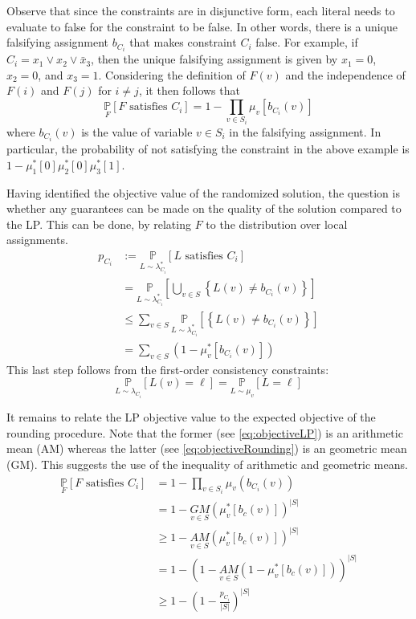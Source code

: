 Observe that since the constraints are in disjunctive form, each literal needs to evaluate to false for the constraint to be false. 
In other words, there is a unique falsifying assignment $b_{C_i}$ that makes constraint $C_i$ false. 
For example, if $C_i = x_1 \vee x_2 \vee \bar{x}_3$, then the unique falsifying assignment is given by $x_1 = 0$, $x_2 = 0$, and $x_3 = 1$. 
Considering the definition of $F(v)$ and the independence of $F(i)$ and $F(j)$ for $i \neq j$, it then follows that 
\begin{equation}
		\underset{F}{\mathbb{P}}[ F \text{ satisfies } C_i] = 1 - \prod_{v \in S_i} \mu_v[b_{C_i}(v)] \label{eq:objectiveRounding}
\end{equation}
where $b_{C_i}(v)$ is the value of variable $v \in S_i$ in the falsifying assignment. 
In particular, the probability of not satisfying the constraint in the above example is $ 1- \mu_1^*[0] \mu_2^*[0] \mu_3^*[1]$.

Having identified the objective value of the randomized solution, the question is whether any guarantees can be made on the quality of the solution compared to the LP. 
This can be done, by relating $F$ to the distribution over local assignments.
\begin{align}
	p_{C_i} &:= \underset{L \sim \lambda_{C_i}^*}{\mathbb{P}} [L \text{ satisfies } C_i] \nonumber\\
			&=  \underset{L \sim \lambda_{C_i}^*}{\mathbb{P}}\left[ \bigcup_{v \in S} \left\{ L(v) \neq b_{C_i}(v) \right\} \right] \nonumber\\
			&\le \sum_{v \in  S } \underset{L \sim \lambda_{C_i}^*}{\mathbb{P}} \left[  \left\{ L(v) \neq b_{C_i}(v) \right\} \right] \nonumber\\
			&= \sum_{v \in S} \left( 1 - \mu_v^*[b_{C_i}(v)] \right) \label{eq:objectiveLP}
\end{align}
This last step follows from the first-order consistency constraints:
\[
	\underset{L \sim \lambda_{C_i} }{\mathbb{P}}[ L(v) = \ell] = \underset{L \sim \mu_v }{\mathbb{P}}[ L = \ell]
\]

It remains to relate the LP objective value to the expected objective of the rounding procedure. 
Note that the former (see \eqref{eq:objectiveLP}) is an arithmetic mean (AM) whereas the latter (see \eqref{eq:objectiveRounding}) is an geometric mean (GM). 
This suggests the use of the inequality of arithmetic and geometric means.
\begin{align*}
		\underset{F}{\mathbb{P}}[ F \text{ satisfies } C_i] &= 1 - \prod_{v \in S_i} \mu_v(b_{C_i}(v))\\
		&= 1 - \underset{v \in S}{GM}(\mu_{v}^*[b_c(v)])^{|S|}\\
		&\ge 1 - \underset{v \in S}{AM}(\mu_{v}^*[b_c(v)])^{|S|}\\
		&= 1 - \left( 1  - \underset{v \in S}{AM}(1 -\mu_{v}^*[b_c(v)]) \right)^{|S|}\\
		&\ge 1 - \left( 1  - \frac{p_{C_i}}{|S|}\right)^{|S|}\\
\end{align*}

